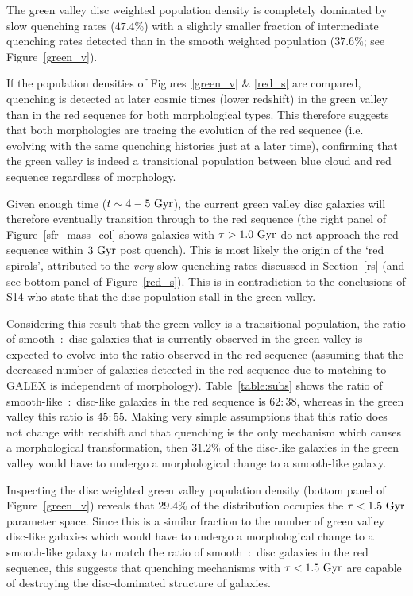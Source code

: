 The green valley disc weighted population density is completely dominated by slow quenching rates ($47.4\%$) with a slightly smaller fraction of intermediate quenching rates detected than in the smooth weighted population ($37.6\%$; see Figure~\ref{green_v}).

If the population densities of Figures~\ref{green_v} \& \ref{red_s} are compared, quenching is detected at later cosmic times (lower redshift) in the green valley than in the red sequence for both morphological types. This therefore suggests that both morphologies are tracing the evolution of the red sequence (i.e. evolving with the same quenching histories just at a later time), confirming that the green valley is indeed a transitional population between blue cloud and red sequence regardless of morphology. 

Given enough time ($t\sim4 - 5~\rm{Gyr}$), the current green valley disc galaxies will therefore eventually transition through to the red sequence (the right panel of Figure~\ref{sfr_mass_col} shows galaxies with $\tau > 1.0~\rm{Gyr}$ do not approach the red sequence within $3~\rm{Gyr}$ post quench). This is most likely the origin of the `red spirals', attributed to the \emph{very} slow quenching rates discussed in Section~\ref{rs} (and see bottom panel of Figure~\ref{red_s}). This is in contradiction to the conclusions of S14 who state that the disc population stall in the green valley. 

Considering this result that the green valley is a transitional population, the ratio of smooth~:~disc galaxies that is currently observed in the green valley is expected to evolve into the ratio observed in the red sequence (assuming that the decreased number of galaxies detected in the red sequence due to matching to GALEX is independent of morphology). Table~\ref{table:subs} shows the ratio of smooth-like~:~disc-like galaxies in the red sequence is $62:38$, whereas in the green valley this ratio is $45:55$. Making very simple assumptions that this ratio does not change with redshift and that quenching is the only mechanism which causes a morphological transformation, then $31.2\%$ of the disc-like galaxies in the green valley would have to undergo a morphological change to a smooth-like galaxy. 

Inspecting the disc weighted green valley population density (bottom panel of Figure~\ref{green_v}) reveals that $29.4\%$ of the distribution occupies the $\tau < 1.5 ~\rm{Gyr}$ parameter space. Since this is a similar fraction to the number of green valley disc-like galaxies which would have to undergo a morphological change to a smooth-like galaxy to match the ratio of smooth~:~disc galaxies in the red sequence, this suggests that quenching mechanisms with $\tau < 1.5 ~\rm{Gyr}$ are capable of destroying the disc-dominated structure of galaxies. 

